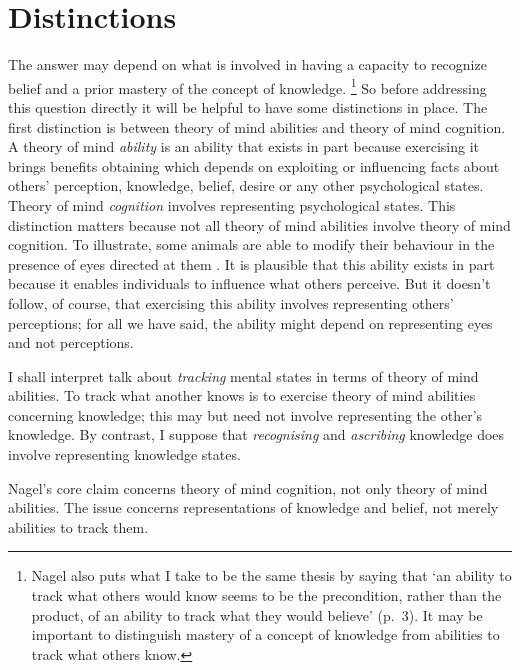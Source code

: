 \documentclass[11pt,a4paper]{extarticle}
\begin{document}
%

 
 

\section{Distinctions}

The answer may depend on what is involved in having a capacity  to recognize belief and a prior mastery of the concept of knowledge.%
\footnote{
Nagel also puts what I take to be the same thesis by saying that `an ability to track what others would know seems to be the precondition, rather than the product, of an ability to track what they would believe' (p.\ 3).
It may be important to distinguish mastery of a concept of knowledge from abilities to track what others know.
}
So before addressing this question directly it will be helpful to have some distinctions in place.
The first distinction is between theory of mind abilities and theory of mind cognition.
A theory of mind \textit{ability} is an ability that exists in part because exercising it brings benefits obtaining which depends on exploiting or influencing facts about others’ perception, knowledge, belief, desire or any other psychological states.  
Theory of mind \textit{cognition}  involves representing psychological states.
This distinction matters because not all theory of mind abilities involve theory of mind cognition.
To illustrate, some animals are able to modify their behaviour  in the presence of eyes directed at them \citep[e.g.][]{ernest-jones_effects_2011}.
It is plausible that this ability exists in part because it enables individuals to influence what others perceive.
But it doesn't follow, of course, that exercising this ability involves representing others' perceptions; for all we have said, the ability might depend on representing eyes and not perceptions.  



I shall interpret talk about \textit{tracking} mental states in terms of theory of mind abilities.
To track what another knows is to exercise theory of mind abilities concerning knowledge; this may but need not involve representing the other's knowledge.
By contrast, I suppose that \textit{recognising} and \textit{ascribing} knowledge does involve representing knowledge states.




Nagel's core claim concerns theory of mind cognition, not only theory of mind abilities. 
The issue concerns representations of knowledge and belief, not merely abilities to track them.%
\end{document}
